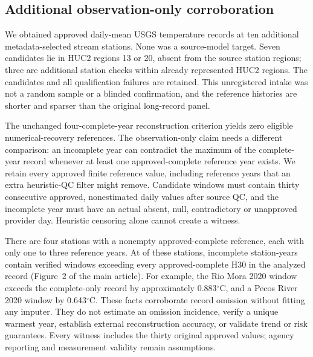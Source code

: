 \subsection{Additional observation-only corroboration}
We obtained approved daily-mean USGS temperature records at ten additional metadata-selected stream stations. None was a source-model target. Seven candidates lie in HUC2 regions 13 or 20, absent from the source station regions; three are additional station checks within already represented HUC2 regions. The candidates and all qualification failures are retained. This unregistered intake was not a random sample or a blinded confirmation, and the reference histories are shorter and sparser than the original long-record panel.

The unchanged four-complete-year reconstruction criterion yields zero eligible numerical-recovery references. The observation-only claim needs a different comparison: an incomplete year can contradict the maximum of the complete-year record whenever at least one approved-complete reference year exists. We retain every approved finite reference value, including reference years that an extra heuristic-QC filter might remove. Candidate windows must contain thirty consecutive approved, nonestimated daily values after source QC, and the incomplete year must have an actual absent, null, contradictory or unapproved provider day. Heuristic censoring alone cannot create a witness.

There are four stations with a nonempty approved-complete reference, each with only one to three reference years. At \WAAdditionalStations{} of these stations, \WAAdditionalYears{} incomplete station-years contain verified windows exceeding every approved-complete H30 in the analyzed record (Figure~2 of the main article). For example, the Rio Mora 2020 window exceeds the complete-only record by approximately 0.883$^{\circ}$C, and a Pecos River 2020 window by 0.643$^{\circ}$C. These facts corroborate record omission without fitting any imputer. They do not estimate an omission incidence, verify a unique warmest year, establish external reconstruction accuracy, or validate trend or risk guarantees. Every witness includes the thirty original approved values; agency reporting and measurement validity remain assumptions.
